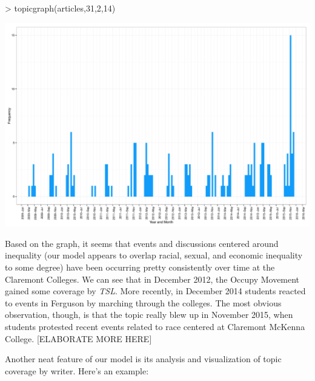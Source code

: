 \documentclass[a4paper]{article}
\begin{document}
\begin{Schunk}
\begin{Sinput}
> topicgraph(articles,31,2,14)
\end{Sinput}
\end{Schunk}
\includegraphics{FinalProject-009}

Based on the graph, it seems that events and discussions centered around inequality (our model appears to overlap racial, sexual, and economic inequality to some degree) have been occurring pretty consistently over time at the Claremont Colleges. We can see that in December 2012, the Occupy Movement gained some coverage by \textit{TSL}. More recently, in December 2014 students reacted to events in Ferguson by marching through the colleges. The most obvious observation, though, is that the topic really blew up in November 2015, when students protested recent events related to race centered at Claremont McKenna College.
[ELABORATE MORE HERE]

Another neat feature of our model is its analysis and visualization of topic coverage by writer. Here's an example:
\end{document}
